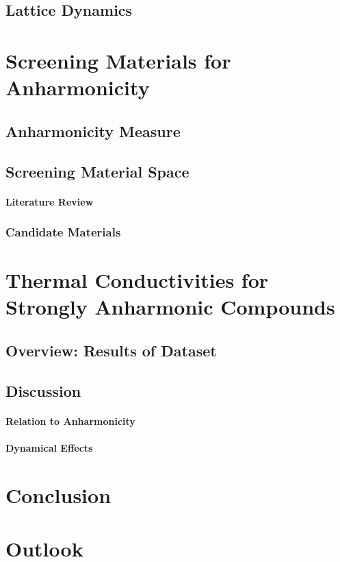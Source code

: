 \documentclass[a4paper,12pt]{book}
\begin{document}

\section{Lattice Dynamics}




\chapter{Screening Materials for Anharmonicity}
\section{Anharmonicity Measure}
\section{Screening Material Space}
\subsubsection{Literature Review}
\subsection{Candidate Materials}

\chapter{Thermal Conductivities for Strongly Anharmonic Compounds}
\section{Overview: Results of Dataset}
\section{Discussion}
\subsubsection{Relation to Anharmonicity}
\subsubsection{Dynamical Effects}

\chapter{Conclusion}

\chapter{Outlook}




\appendix

\end{document}
